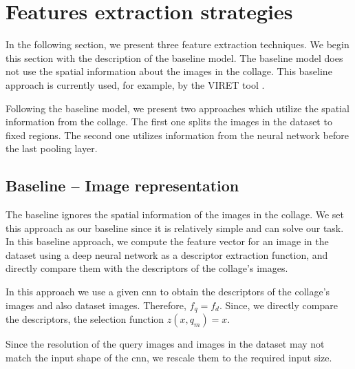 \section{Features extraction strategies}

In the following section, we present three feature extraction techniques. We begin this section with the description of the baseline model. The baseline model does not use the spatial information about the images in the collage. This baseline approach is currently used, for example, by the VIRET tool \citep{kovalvcik2020viret}. 

Following the baseline model, we present two approaches which utilize the spatial information from the collage. The first one splits the images in the dataset to fixed regions. The second one utilizes information from the neural network before the last pooling layer.

\subsection{Baseline -- Image representation}

The baseline ignores the spatial information of the images in the collage. We set this approach as our baseline since it is relatively simple and can solve our task. In this baseline approach, we compute the feature vector for an image in the dataset using a deep neural network as a descriptor extraction function, and directly compare them with the descriptors of the collage's images.

In this approach we use a given \acrshort{cnn} to obtain the descriptors of the collage's images and also dataset images. Therefore, $f_q = f_d$. Since, we directly compare the descriptors, the selection function $z(x, q_m) = x$.

Since the resolution of the query images and images in the dataset may not match the input shape of the \acrshort{cnn}, we rescale them to the required input size.



